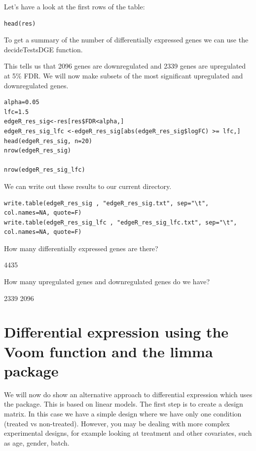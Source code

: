 \begin{steps}
\begin{steps}
Let's have a look at the first rows of the table:
\begin{lstlisting}
head(res)
\end{lstlisting}
\end{steps}


To get a summary of the number of differentially expressed genes we can use the decideTestsDGE function.

This tells us that 2096 genes are downregulated and 2339 genes are upregulated at 5\% FDR.
We will now make subsets of the most significant upregulated and downregulated genes.

\begin{steps}
\begin{lstlisting}
alpha=0.05
lfc=1.5
edgeR_res_sig<-res[res$FDR<alpha,]
edgeR_res_sig_lfc <-edgeR_res_sig[abs(edgeR_res_sig$logFC) >= lfc,]
head(edgeR_res_sig, n=20)
nrow(edgeR_res_sig)

nrow(edgeR_res_sig_lfc)

\end{lstlisting}
\end{steps}
We can write out these results to our current directory.

\begin{steps}
\begin{lstlisting}
write.table(edgeR_res_sig , "edgeR_res_sig.txt", sep="\t", col.names=NA, quote=F)
write.table(edgeR_res_sig_lfc , "edgeR_res_sig_lfc.txt", sep="\t", col.names=NA, quote=F)
\end{lstlisting}

\end{steps}

\begin{questions}
How many differentially expressed genes are there? 
\begin{answer}
4435
\end{answer}

How many upregulated genes and downregulated genes do we have?
\begin{answer}
2339
2096
\end{answer}

\end{questions}




\newpage
\section{Differential expression using the Voom function and the limma package}
We will now do show an alternative approach to differential expression which uses the  package.
This is based on linear models. The first step is to create a design matrix. In this case we have a simple design where we have only one condition (treated vs non-treated). However, you may be dealing with more complex experimental designs, for example looking at treatment and other covariates, such as age, gender, batch.



\end{steps}
